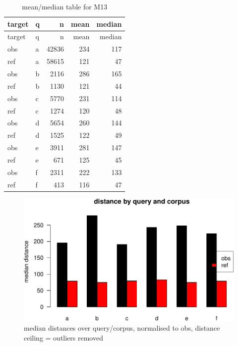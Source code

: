 \documentclass[12pt,a4paper]{article}
\begin{document}
\begin{longtable}[]{@{}llrrr@{}}
\caption{\label{tab:dfe-table}mean/median table for M13}\tabularnewline
\toprule\noalign{}
target & q & n & mean & median \\
\midrule\noalign{}
\endfirsthead
\toprule\noalign{}
target & q & n & mean & median \\
\midrule\noalign{}
\endhead
\bottomrule\noalign{}
\endlastfoot
obs & a & 42836 & 234 & 117 \\
ref & a & 58615 & 121 & 47 \\
obs & b & 2116 & 286 & 165 \\
ref & b & 1130 & 121 & 44 \\
obs & c & 5770 & 231 & 114 \\
ref & c & 1274 & 120 & 48 \\
obs & d & 5654 & 260 & 144 \\
ref & d & 1525 & 122 & 49 \\
obs & e & 3911 & 281 & 147 \\
ref & e & 671 & 125 & 45 \\
obs & f & 2311 & 222 & 133 \\
ref & f & 413 & 116 & 47 \\
\end{longtable}

\begin{figure}[H]
\includegraphics{spund-pub_files/figure-latex/barplot-mean-1} \caption{median distances over query/corpus, normalised to obs, distance ceiling =  outliers removed}\label{fig:barplot-mean}
\end{figure}
\end{document}
